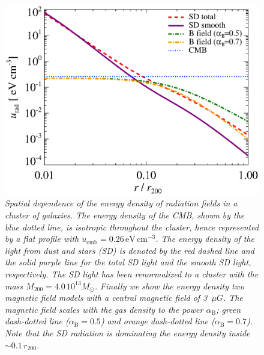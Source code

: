 \documentclass[10pt,aps,pra,reprint,amsmath,amsfonts,amssymb,showpacs]{revtex4-1}
\newcommand{\msun}{{M_\odot}}
\newcommand{\rmn}{\mathrm}
\newcommand{\rvir}{r_{200}}
\newcommand{\mvir}{M_{200}}
\begin{document}
\begin{figure}%
 \includegraphics[width=0.99\columnwidth]{figures/ucool.eps}
\caption{\it Spatial dependence of the energy density of radiation
  fields in a cluster of galaxies. The energy density of the CMB, shown
  by the blue dotted line, is isotropic throughout the cluster, hence
  represented by a flat profile with
  $u_\rmn{cmb}=0.26\,\rmn{eV}\,\rmn{cm}^{-3}$. The energy density of
  the light from dust and stars (SD) is denoted by the red dashed line
  and the solid purple line for the total SD light and the smooth SD
  light, respectively. The SD light has been renormalized to a cluster
  with the mass $\mvir=4.0\,10^{13}\msun$. Finally we show the energy density
  two magnetic field models with a central magnetic field of 3~$\mu
  G$. The magnetic field scales with the gas density to the power
  $\alpha_\rmn{B}$; green dash-dotted line ($\alpha_\rmn{B}=0.5$) and
  orange dash-dotted line ($\alpha_\rmn{B}=0.7$). Note that the SD
  radiation is dominating the energy density inside $\sim0.1\,\rvir$.}
 \label{fig5}
\end{figure}
\end{document}
